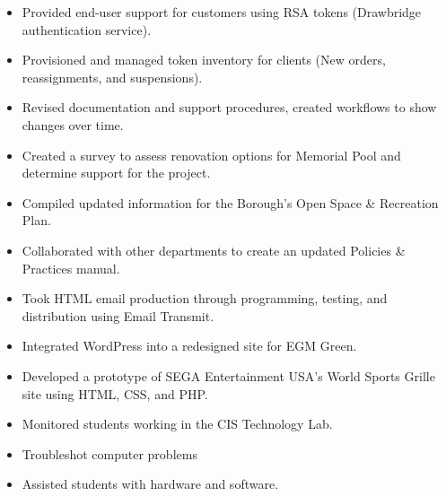 \documentclass[letterpaper,12pt]{article}
\begin{document}
%
\begin{itemize}[nosep]
  \item
  Provided end-user support for customers using RSA tokens (Drawbridge authentication service).
  \item
  Provisioned and managed token inventory for clients (New orders, reassignments, and suspensions).
  \item
  Revised documentation and support procedures, created workflows to show changes over time.
\end{itemize}
%
\begin{itemize}[nosep]
  \item
  Created a survey to assess renovation options for Memorial Pool and determine support for the project.
  \item
  Compiled updated information for the Borough’s Open Space \& Recreation Plan.
  \item
  Collaborated with other departments to create an updated Policies \&
  Practices manual.
\end{itemize}
%
\begin{itemize}[nosep]
  \item
  Took HTML email production through programming, testing, and distribution using Email Transmit.
\item
  Integrated WordPress into a redesigned site for EGM Green.
\item
  Developed a prototype of SEGA Entertainment USA’s World Sports Grille site using HTML, CSS, and PHP.
\end{itemize}
\pagebreak[4]
%
\begin{itemize}[nosep]
  \item
  Monitored students working in the CIS Technology Lab.
\item
  Troubleshot computer problems
\item
  Assisted students with hardware and software.
\end{itemize}
\end{document}
